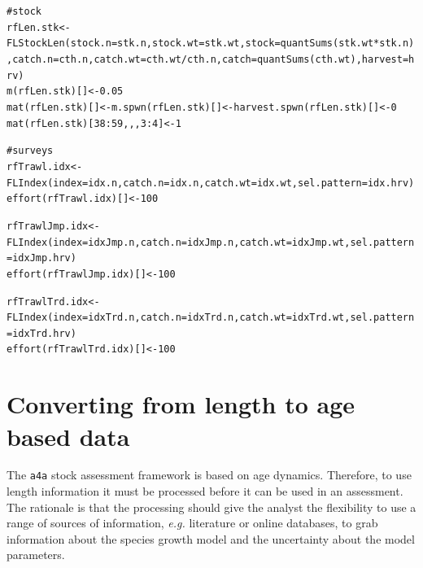 \documentclass[a4paper,english,10pt]{article}\usepackage[]{graphicx}\usepackage[]{color}
\makeatletter
\newcommand{\hlnum}[1]{\textcolor[rgb]{0.2,0.2,0.2}{#1}}%
\newcommand{\hlcom}[1]{\textcolor[rgb]{0.2,0.267,0.4}{#1}}%
\newcommand{\hlopt}[1]{\textcolor[rgb]{0.2,0.2,0.2}{#1}}%
\newcommand{\hlstd}[1]{\textcolor[rgb]{0,0,0}{#1}}%
\newcommand{\hlkwb}[1]{\textcolor[rgb]{0.361,0.506,0.596}{#1}}%
\newcommand{\hlkwc}[1]{\textcolor[rgb]{0.361,0.506,0.596}{#1}}%
\newcommand{\hlkwd}[1]{\textcolor[rgb]{0.361,0.506,0.596}{#1}}%
\newenvironment{kframe}{%
 \def\at@end@of@kframe{}%
 \ifinner\ifhmode%
  \def\at@end@of@kframe{\end{minipage}}%
  \begin{minipage}{\columnwidth}%
 \fi\fi%
 \def\FrameCommand##1{\hskip\@totalleftmargin \hskip-\fboxsep
 \colorbox{shadecolor}{##1}\hskip-\fboxsep
     \hskip-\linewidth \hskip-\@totalleftmargin \hskip\columnwidth}%
 \MakeFramed {\advance\hsize-\width
   \@totalleftmargin\z@ \linewidth\hsize
   \@setminipage}}%
 {\par\unskip\endMakeFramed%
 \at@end@of@kframe}
\newenvironment{knitrout}{}{} %
\newcommand{\initiative}[1]{{\texttt{#1}}}
\makeatother
\begin{document}
\begin{knitrout}
\color{fgcolor}\begin{kframe}
\begin{alltt}
\hlcom{# stock}
\hlstd{rfLen.stk} \hlkwb{<-} \hlkwd{FLStockLen}\hlstd{(}\hlkwc{stock.n}\hlstd{=stk.n,} \hlkwc{stock.wt}\hlstd{=stk.wt,} \hlkwc{stock}\hlstd{=}\hlkwd{quantSums}\hlstd{(stk.wt}\hlopt{*}\hlstd{stk.n),} \hlkwc{catch.n}\hlstd{=cth.n,} \hlkwc{catch.wt}\hlstd{=cth.wt}\hlopt{/}\hlstd{cth.n,} \hlkwc{catch}\hlstd{=}\hlkwd{quantSums}\hlstd{(cth.wt),} \hlkwc{harvest}\hlstd{=hrv)}
\hlkwd{m}\hlstd{(rfLen.stk)[]} \hlkwb{<-} \hlnum{0.05}
\hlkwd{mat}\hlstd{(rfLen.stk)[]} \hlkwb{<-} \hlkwd{m.spwn}\hlstd{(rfLen.stk)[]} \hlkwb{<-} \hlkwd{harvest.spwn}\hlstd{(rfLen.stk)[]} \hlkwb{<-} \hlnum{0}
\hlkwd{mat}\hlstd{(rfLen.stk)[}\hlnum{38}\hlopt{:}\hlnum{59}\hlstd{,,,}\hlnum{3}\hlopt{:}\hlnum{4}\hlstd{]} \hlkwb{<-} \hlnum{1}

\hlcom{# surveys}
\hlstd{rfTrawl.idx} \hlkwb{<-} \hlkwd{FLIndex}\hlstd{(}\hlkwc{index}\hlstd{=idx.n,} \hlkwc{catch.n}\hlstd{=idx.n,} \hlkwc{catch.wt}\hlstd{=idx.wt,} \hlkwc{sel.pattern}\hlstd{=idx.hrv)}
\hlkwd{effort}\hlstd{(rfTrawl.idx)[]} \hlkwb{<-} \hlnum{100}

\hlstd{rfTrawlJmp.idx} \hlkwb{<-} \hlkwd{FLIndex}\hlstd{(}\hlkwc{index}\hlstd{=idxJmp.n,} \hlkwc{catch.n}\hlstd{=idxJmp.n,} \hlkwc{catch.wt}\hlstd{=idxJmp.wt,} \hlkwc{sel.pattern}\hlstd{=idxJmp.hrv)}
\hlkwd{effort}\hlstd{(rfTrawlJmp.idx)[]} \hlkwb{<-} \hlnum{100}

\hlstd{rfTrawlTrd.idx} \hlkwb{<-} \hlkwd{FLIndex}\hlstd{(}\hlkwc{index}\hlstd{=idxTrd.n,} \hlkwc{catch.n}\hlstd{=idxTrd.n,} \hlkwc{catch.wt}\hlstd{=idxTrd.wt,} \hlkwc{sel.pattern}\hlstd{=idxTrd.hrv)}
\hlkwd{effort}\hlstd{(rfTrawlTrd.idx)[]} \hlkwb{<-} \hlnum{100}
\end{alltt}
\end{kframe}
\end{knitrout}

\pagebreak
\section{Converting from length to age based data}\label{sec:l2a}

The \initiative{a4a} stock assessment framework is based on age dynamics. Therefore, to use length information it must be processed before it can be used in an assessment. The rationale is that the processing should give the analyst the flexibility to use a range of sources of information, \emph{e.g.} literature or online databases, to grab information about the species growth model and the uncertainty about the model parameters.
\end{document}
